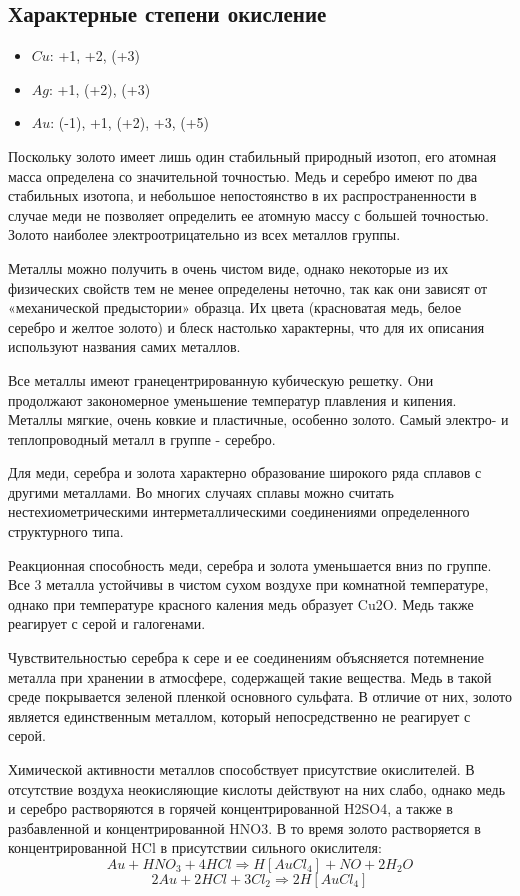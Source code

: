\documentclass[11pt]{article}
\begin{document}
\subsection{Характерные степени окисление}
\begin{itemize}
\item $Cu$: +1, +2, (+3)
\item $Ag$: +1, (+2), (+3)
\item $Au$: (-1), +1, (+2), +3, (+5)
\end{itemize}

Поскольку золото имеет лишь один стабильный природный изотоп, его атомная
масса определена со значительной точностью. Медь и серебро имеют по два стабильных
изотопа, и небольшое непостоянство в их распространенности в случае меди не позволяет
определить ее атомную массу с большей точностью.
Золото наиболее электроотрицательно из всех металлов группы.

Металлы можно получить в очень чистом виде, однако некоторые из их
физических свойств тем не менее определены неточно, так как они зависят от
«механической предыстории» образца. Их цвета (красноватая медь, белое серебро и
желтое золото) и блеск настолько характерны, что для их описания используют названия
самих металлов.

Все металлы имеют гранецентрированную кубическую решетку. Oни продолжают
закономерное уменьшение температур плавления и кипения. Металлы мягкие, очень
ковкие и пластичные, особенно золото. Самый электро- и теплопроводный металл в
группе - серебро.

Для меди, серебра и золота характерно образование широкого ряда сплавов с
другими металлами. Во многих случаях сплавы можно считать нестехиометрическими
интерметаллическими соединениями определенного структурного типа.

Реакционная способность меди, серебра и золота уменьшается вниз по группе. Все
3 металла устойчивы в чистом сухом воздухе при комнатной температуре, однако при
температуре красного каления медь образует Cu2O. Медь также реагирует с серой и
галогенами. 

Чувствительностью серебра к сере и ее соединениям объясняется потемнение
металла при хранении в атмосфере, содержащей такие вещества. Медь в такой среде
покрывается зеленой пленкой основного сульфата. В отличие от них, золото является
единственным металлом, который непосредственно не реагирует с серой.

Химической активности металлов способствует присутствие окислителей. В
отсутствие воздуха неокисляющие кислоты действуют на них слабо, однако медь и
серебро растворяются в горячей концентрированной H2SO4, а также в разбавленной и
концентрированной HNO3. В то время золото растворяется в концентрированной HCl в
присутствии сильного окислителя:
$$Au + HNO_3 + 4HCl \Rightarrow H[AuCl_4] + NO + 2H_2O$$
$$2Au + 2HCl + 3Cl_2 \Rightarrow 2H[AuCl_4]$$
\end{document}
